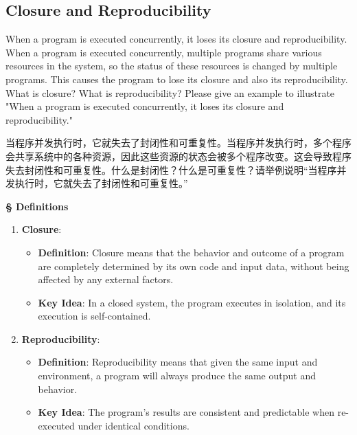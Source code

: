 \documentclass[a4paper]{book}
\newcommand{\sfbf}[1]{{\normalsize\textsf{\textbf{§ #1}}}}
\begin{document}
\subsection{Closure and Reproducibility}

\begin{greenbox}
When a program is executed concurrently, it loses its closure and reproducibility. When a program is executed concurrently, multiple programs share various resources in the system, so the status of these resources is changed by multiple programs. This causes the program to lose its closure and also its reproducibility. What is closure? What is reproducibility? Please give an example to illustrate "When a program is executed concurrently, it loses its closure and reproducibility."
\end{greenbox}

当程序并发执行时，它就失去了封闭性和可重复性。当程序并发执行时，多个程序会共享系统中的各种资源，因此这些资源的状态会被多个程序改变。这会导致程序失去封闭性和可重复性。什么是封闭性？什么是可重复性？请举例说明“当程序并发执行时，它就失去了封闭性和可重复性。”

\sfbf{Definitions}

\begin{enumerate}
\item 
\textbf{Closure}:
\begin{itemize}
\item 
\textbf{Definition}: Closure means that the behavior and outcome of a program are completely determined by its own code and input data, without being affected by any external factors.

\item 
\textbf{Key Idea}: In a closed system, the program executes in isolation, and its execution is self-contained.

\end{itemize}

\item 
\textbf{Reproducibility}:
\begin{itemize}
\item 
\textbf{Definition}: Reproducibility means that given the same input and environment, a program will always produce the same output and behavior.

\item 
\textbf{Key Idea}: The program’s results are consistent and predictable when re-executed under identical conditions.

\end{itemize}

\end{enumerate}
\end{document}
